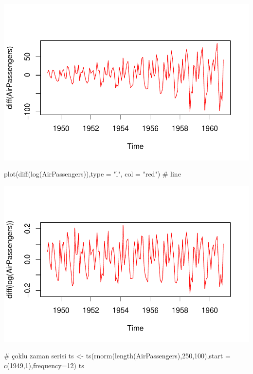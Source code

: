 \documentclass[
  letterpaper,
  DIV=11,
  numbers=noendperiod]{scrreprt}
\newenvironment{Shaded}{\begin{snugshade}}{\end{snugshade}}
\newcommand{\AttributeTok}[1]{\textcolor[rgb]{0.40,0.45,0.13}{#1}}
\newcommand{\CommentTok}[1]{\textcolor[rgb]{0.37,0.37,0.37}{#1}}
\newcommand{\DecValTok}[1]{\textcolor[rgb]{0.68,0.00,0.00}{#1}}
\newcommand{\FunctionTok}[1]{\textcolor[rgb]{0.28,0.35,0.67}{#1}}
\newcommand{\NormalTok}[1]{\textcolor[rgb]{0.00,0.23,0.31}{#1}}
\newcommand{\OtherTok}[1]{\textcolor[rgb]{0.00,0.23,0.31}{#1}}
\newcommand{\StringTok}[1]{\textcolor[rgb]{0.13,0.47,0.30}{#1}}
\begin{document}
\includegraphics{data_analysis_files/figure-pdf/unnamed-chunk-5-5.pdf}

\begin{Shaded}
\begin{Highlighting}[]
\FunctionTok{plot}\NormalTok{(}\FunctionTok{diff}\NormalTok{(}\FunctionTok{log}\NormalTok{(AirPassengers)),}\AttributeTok{type =} \StringTok{"l"}\NormalTok{, }\AttributeTok{col =} \StringTok{"red"}\NormalTok{) }\CommentTok{\# line}
\end{Highlighting}
\end{Shaded}

\includegraphics{data_analysis_files/figure-pdf/unnamed-chunk-5-6.pdf}

\begin{Shaded}
\begin{Highlighting}[]
\CommentTok{\# çoklu zaman serisi}
\NormalTok{ts }\OtherTok{\textless{}{-}} \FunctionTok{ts}\NormalTok{(}\FunctionTok{rnorm}\NormalTok{(}\FunctionTok{length}\NormalTok{(AirPassengers),}\DecValTok{250}\NormalTok{,}\DecValTok{100}\NormalTok{),}\AttributeTok{start =} \FunctionTok{c}\NormalTok{(}\DecValTok{1949}\NormalTok{,}\DecValTok{1}\NormalTok{),}\AttributeTok{frequency=}\DecValTok{12}\NormalTok{)}
\NormalTok{ts}
\end{Highlighting}
\end{Shaded}
\end{document}
